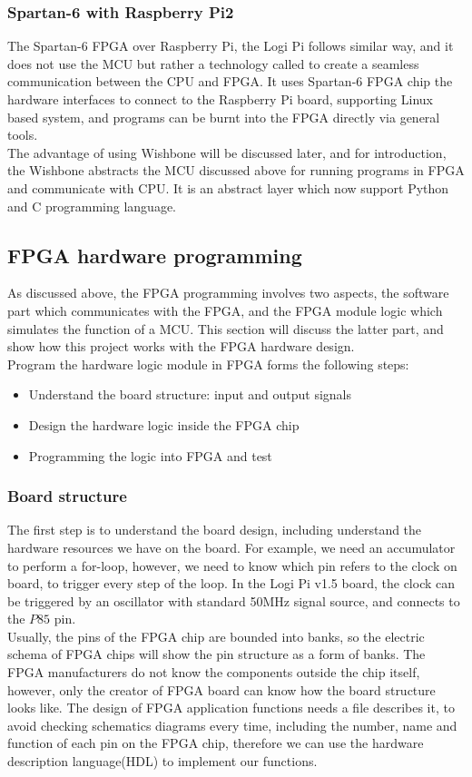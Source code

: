 \documentclass[11pt,openright,a4paper]{report}
\begin{document}
\subsubsection{Spartan-6 with Raspberry Pi2}
The Spartan-6 FPGA over Raspberry Pi, the Logi Pi follows similar way, and it does not use the MCU but rather a technology called to create a seamless communication between the CPU and FPGA. It uses Spartan-6 FPGA chip the hardware interfaces to connect to the Raspberry Pi board, supporting Linux based system, and programs can be burnt into the FPGA directly via general tools.\\
The advantage of using Wishbone will be discussed later, and for introduction, the Wishbone abstracts the MCU discussed above for running programs in FPGA and communicate with CPU. It is an abstract layer which now support Python and C programming language.\\

\subsection{FPGA hardware programming}
As discussed above, the FPGA programming involves two aspects, the software part which communicates with the FPGA, and the FPGA module logic which simulates the function of a MCU. This section will discuss the latter part, and show how this project works with the FPGA hardware design.\\
Program the hardware logic module in FPGA forms the following steps:
\begin{itemize}
	\item Understand the board structure: input and output signals
	\item Design the hardware logic inside the FPGA chip
	\item Programming the logic into FPGA and test
\end{itemize}
\subsubsection{Board structure}
The first step is to understand the board design, including understand the hardware resources we have on the board. For example, we need an accumulator to perform a for-loop, however, we need to know which pin refers to the clock on board, to trigger every step of the loop. In the Logi Pi v1.5 board, the clock can be triggered by an oscillator with standard 50MHz signal source, and connects to the $P85$ pin. \\
Usually, the pins of the FPGA chip are bounded into banks, so the electric schema of FPGA chips will show the pin structure as a form of banks. The FPGA manufacturers do not know the components outside the chip itself, however, only the creator of FPGA board can know how the board structure looks like. The design of FPGA application functions needs a file describes it, to avoid checking schematics diagrams every time, including the number, name and function of each pin on the FPGA chip, therefore we can use the hardware description language(HDL) to implement our functions.\\
\end{document}
